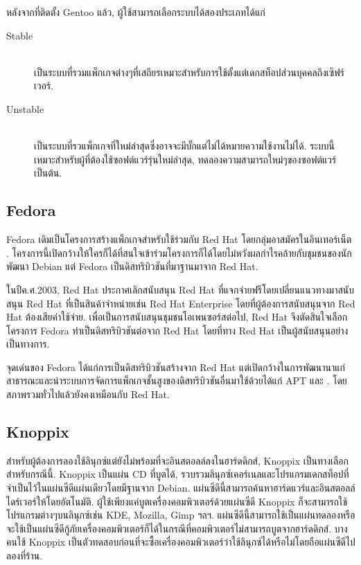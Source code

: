 \begin{thwbr}
{{หลังจากที่ติดตั้ง Gentoo แล้ว, ผู้ใช้สามารถเลือกระบบได้สองประเภทได้แก่
\begin{description}
\item[Stable] \mbox{}\\
เป็นระบบที่รวมแพ็กเกจต่างๆที่เสถียรเหมาะสำหรับการใช้ตั้งแต่เดกสท็อปส่วนบุคคลถึงเซิฟร์เวอร์.
\item[Unstable] \mbox{}\\
เป็นระบบที่รวแพ็กเกจที่ใหม่ล่าสุดซึ่งอาจจะมีบั๊กแต่ไม่ได้หมายความใช้งานไม่ได้. ระบบนี้เหมาะสำหรับผู้ที่ต้องใช้ซอฟต์แวร์รุ่นใหม่ล่าสุด, ทดลองความสามารถใหม่ๆของซอฟต์แวร์เป็นต้น.
\end{description}




\subsection{{\latintext Fedora}}%

Fedora เดิมเป็นโครงการสร้างแพ็กเกจสำหรับใช้ร่วมกับ Red Hat โดยกลุ่มอาสมัครในอินเทอร์เน็ต \cite{fedora_original}. โครงการนี้เปิดกว้างให้ใครก็ได้ที่สนใจเข้าร่วมโครงการก็ได้โดยไม่หวังผลกำไรคล้ายกับชุมชนของนักพัฒนา Debian แต่ Fedora เป็นดิสทริบิวชันที่มาฐานมาจาก Red Hat.

ในปีค.ศ.2003, Red Hat ประกาศเลิกสนับสนุน Red Hat ที่แจกจ่ายฟรีโดยเปลี่ยนแนวทางมาสนับสนุน Red Hat ที่เป็นสินค้าจำหน่ายเช่น Red Hat Enterprise โดยที่ผู้ต้องการสนับสนุนจาก Red Hat ต้องเสียค่าใช้จ่าย. เพื่อเป็นการสนับสนุนชุมชนโอเพนซอร์สต่อไป, Red Hat จึงตัดสินใจเลือกโครงการ Fedora ทำเป็นดิสทริบิวชันต่อจาก Red Hat โดยที่ทาง Red Hat เป็นผู้สนับสนุนอย่างเป็นทางการ. 

จุดเด่นของ Fedora ได้แก่การเป็นดิสทริบิวชันสร้างจาก Red Hat แต่เปิดกว้างในการพัฒนานาแก่สาธารณะและนำระบบการจัดการแพ็กเกจชั้นสูงของดิสทริบิวชันอื่นมาใช้ด้วยได้แก่ APT และ . โดยสภาพรวมทั่วไปแล้วยังคงเหมือนกับ Red Hat.


\subsection{{\latintext Knoppix}}%
สำหรับผู้ต้องการลองใช้ลินุกซ์แต่ยังไม่พร้อมที่จะอินสตอลล์ลงในฮาร์ดดิกส์, Knoppix เป็นทางเลือกสำหรับกรณีนี้. Knoppix เป็นแผ่น CD ที่บูตได้, รวบรวมลินุกซ์เคอร์เนลและโปรแกรมเดกสท็อปที่จำเป็นไว้ในแผ่นซีดีแผ่นเดียวโดยมีฐานจาก Debian. แผ่นซีดีนี้สามารถค้นหาฮาร์ดแวร์และอินสตอลล์ไดร์เวอร์ให้โดยอัตโนมัติ. ผู้ใช้เพียงแค่บูตเครื่องคอมพิวเตอร์ด้วยแผ่นซีดี Knoppix ก็จะสามารถใช้โปรแกรมต่างๆบนลินุกซ์เช่น KDE, Mozilla, Gimp ฯลฯ. แผ่นซีดีนี้สามารถใช้เป็นแผ่นทดลองหรือจะใช้เป็นแผ่นซีดีกู้ภัยเครื่องคอมพิวเตอร์ก็ได้ในกรณีที่คอมพิวเตอร์ไม่สามารถบูตจากฮาร์ดดิกส์. บางคนใช้ Knoppix เป็นตัวทดสอบก่อนที่จะซื้อเครื่องคอมพิวเตอร์ว่าใช้ลินุกซ์ได้หรือไม่โดยถือแผ่นซีดีไปลองที่ร้าน.

}}
\end{thwbr}
